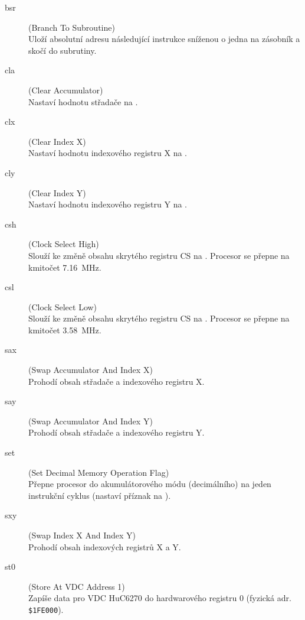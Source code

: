 \begin{description}
\item[{\sc bsr}] (Branch To Subroutine) \\
	Uloží absolutní adresu následující instrukce sníženou o jedna na zásobník a
	skočí do subrutiny.

\item[{\sc cla}] (Clear Accumulator) \\
	Nastaví hodnotu střadače na .

\item[{\sc clx}] (Clear Index X) \\
	Nastaví hodnotu indexového registru {\sf X} na .

\item[{\sc cly}] (Clear Index Y) \\
	Nastaví hodnotu indexového registru {\sf Y} na .

\item[{\sc csh}] (Clock Select High) \\
	Slouží ke změně obsahu skrytého registru {\sf CS} na . Procesor se přepne
	na kmitočet 7.16~MHz.

\item[{\sc csl}] (Clock Select Low) \\
	Slouží ke změně obsahu skrytého registru {\sf CS} na . Procesor se přepne
	na kmitočet 3.58~MHz.

\item[{\sc sax}] (Swap Accumulator And Index X) \\
	Prohodí obsah střadače a indexového registru {\sf X}.

\item[{\sc say}] (Swap Accumulator And Index Y) \\
	Prohodí obsah střadače a indexového registru {\sf Y}.

\item[{\sc set}] (Set Decimal Memory Operation Flag) \\
	Přepne procesor do akumulátorového módu (decimálního) na jeden instrukční
	cyklus (nastaví příznak  na ).

\item[{\sc sxy}] (Swap Index X And Index Y) \\
	Prohodí obsah indexových registrů {\sf X} a {\sf Y}.

\item[{\sc st0}] (Store At VDC Address 1) \\
	Zapíše data pro VDC HuC6270 do hardwarového registru 0 (fyzická adr. {\tt \$1FE000}).


\end{description}
